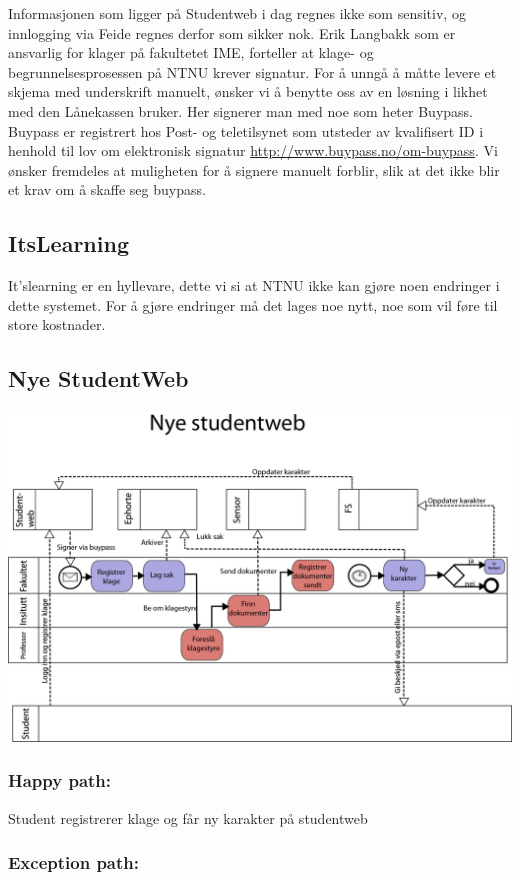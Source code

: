 \documentclass[12pt]{article}
\begin{document}
Informasjonen som ligger på Studentweb i dag regnes ikke som sensitiv, og innlogging via Feide regnes derfor som sikker nok. Erik Langbakk som er ansvarlig for klager på fakultetet IME, forteller at klage- og begrunnelsesprosessen på NTNU krever signatur. For å unngå å måtte levere et skjema med underskrift manuelt, ønsker vi å benytte oss av en løsning i likhet med den Lånekassen bruker. Her signerer man med noe som heter Buypass. Buypass er registrert hos Post- og teletilsynet som utsteder av kvalifisert ID i henhold til lov om elektronisk signatur \url{http://www.buypass.no/om-buypass}. Vi ønsker fremdeles at muligheten for å signere manuelt forblir, slik at det ikke blir et krav om å skaffe seg buypass.


\subsection*{ItsLearning}
It’slearning er en hyllevare, dette vi si at NTNU ikke kan gjøre noen endringer i dette systemet. For å gjøre endringer må det lages noe nytt, noe som vil føre til store kostnader.


\subsection{Nye StudentWeb}

\includegraphics[width=0.9 \textwidth]{nyestudentweb}

\subsubsection*{Happy path:}

Student registrerer klage og får ny karakter på studentweb

\subsubsection*{Exception path:}
\end{document}
